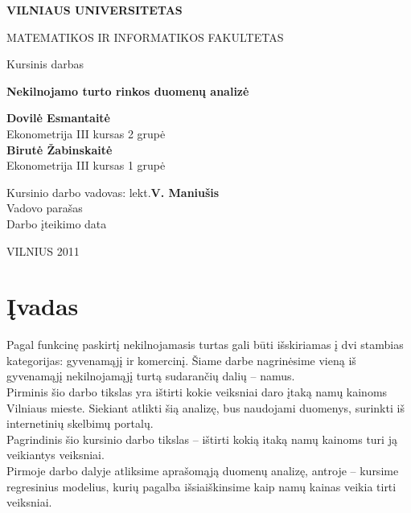 \documentclass[a4paper]{article}
\begin{document}
\begin{titlepage}

\centerline{\bf \large VILNIAUS UNIVERSITETAS}
\bigskip
\centerline{\large MATEMATIKOS IR INFORMATIKOS FAKULTETAS}
\vskip 120pt
\vskip 50pt
\centerline{\Large Kursinis darbas}
\begin{center}
    {\bf \huge Nekilnojamo turto rinkos duomenų analizė\\
    \smallskip  
    \smallskip}
\end{center}
\bigskip
\vskip 120pt
\raggedleft
{\large\textbf{Dovilė Esmantaitė}\\Ekonometrija III kursas 2 grupė\\ \textbf{Birutė Žabinskaitė}\\Ekonometrija III kursas 1 grupė}
\vskip 30pt
\raggedright
{\large Kursinio darbo vadovas: lekt.\textbf{V. Maniušis}\\}
{\large Vadovo parašas\underline{\hskip 70pt}\\}
{\large Darbo įteikimo data\underline{\hskip 70pt}\\}
\vskip 50pt
\centerline{\large VILNIUS 2011}
\end{titlepage}
\newpage

\tableofcontents
\newpage
\section{Įvadas}
\hspace*{0,52cm}Pagal funkcinę paskirtį nekilnojamasis turtas gali būti išskiriamas į dvi stambias kategorijas: gyvenamąjį ir komercinį. Šiame darbe nagrinėsime vieną iš gyvenamąjį nekilnojamąjį turtą sudarančių dalių -- namus.\\
\hspace*{0,52cm}Pirminis šio darbo tikslas yra ištirti kokie veiksniai daro įtaką namų kainoms Vilniaus mieste. Siekiant atlikti šią analizę, bus naudojami duomenys, surinkti iš internetinių skelbimų portalų.\\
\hspace*{0,52cm}Pagrindinis šio kursinio darbo tikslas -- ištirti kokią itaką namų kainoms turi ją veikiantys veiksniai.\\
\hspace*{0,52cm}Pirmoje darbo dalyje atliksime aprašomąją duomenų analizę, antroje -- kursime regresinius modelius, kurių pagalba išsiaiškinsime kaip namų kainas veikia tirti veiksniai.
\newpage
\end{document}

